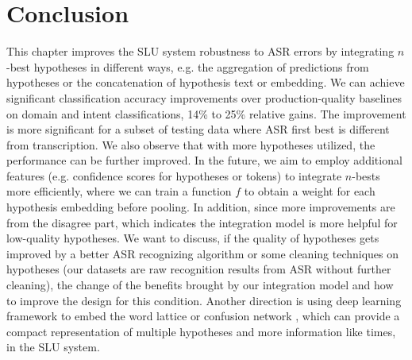 \section{Conclusion}
\label{speech:conclusion}
This chapter improves the SLU system robustness to ASR errors by integrating $n$-best hypotheses in different ways, e.g. the aggregation of predictions from hypotheses or the concatenation of hypothesis text or embedding. 
We can achieve significant classification accuracy improvements over production-quality baselines on domain and intent classifications, 14\% to 25\% relative gains.  The improvement is more significant for a subset of testing data where ASR first best is different from transcription. We also observe that with more hypotheses utilized, the performance can be further improved. 
In the future, we aim to employ additional features (e.g. confidence scores for hypotheses or tokens) to integrate $n$-bests more efficiently, where we can train a function $f$ to obtain a weight for each hypothesis embedding before pooling. 
In addition, since more improvements are from the disagree part, which indicates the integration model is more helpful for low-quality hypotheses. We want to discuss, if the quality of hypotheses gets improved by a better ASR recognizing algorithm or some cleaning techniques on hypotheses (our datasets are raw recognition results from ASR without further cleaning), the change of the benefits brought by our integration model and how to improve the design for this condition.
Another direction is using deep learning framework to embed the word lattice \citep{liu2014efficient} or confusion network \citep{hakkani2006beyond, tur2002improving}, which can provide a compact representation of multiple hypotheses and more information like times, in the SLU system. 



